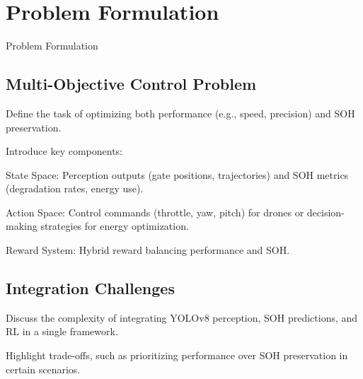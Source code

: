 \chapter{Problem Formulation}\label{ch:3}
\minitoc

Problem Formulation

\newpage

\section{Multi-Objective Control Problem}

Define the task of optimizing both performance (e.g., speed, precision) and SOH preservation.

Introduce key components:

State Space: Perception outputs (gate positions, trajectories) and SOH metrics (degradation rates, energy use).

Action Space: Control commands (throttle, yaw, pitch) for drones or decision-making strategies for energy optimization.

Reward System: Hybrid reward balancing performance and SOH.


\section{Integration Challenges}

Discuss the complexity of integrating YOLOv8 perception, SOH predictions, and RL in a single framework.

Highlight trade-offs, such as prioritizing performance over SOH preservation in certain scenarios.


\endinput